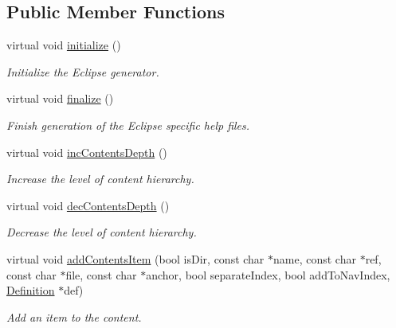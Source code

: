 \subsection*{Public Member Functions}
\begin{DoxyCompactItemize}
\item 
virtual void \mbox{\hyperlink{class_eclipse_help_aefada9c9b474d36ef9b771e2361c8dc1}{initialize}} ()
\begin{DoxyCompactList}\small\item\em Initialize the Eclipse generator. \end{DoxyCompactList}\item 
virtual void \mbox{\hyperlink{class_eclipse_help_a6a8532316d47986f371459e6b09b9d71}{finalize}} ()
\begin{DoxyCompactList}\small\item\em Finish generation of the Eclipse specific help files. \end{DoxyCompactList}\item 
\mbox{\label{class_eclipse_help_a84c091576dab518ca0301144b96cc826}} 
virtual void \mbox{\hyperlink{class_eclipse_help_a84c091576dab518ca0301144b96cc826}{inc\+Contents\+Depth}} ()
\begin{DoxyCompactList}\small\item\em Increase the level of content hierarchy. \end{DoxyCompactList}\item 
virtual void \mbox{\hyperlink{class_eclipse_help_a20d28e23b12cd60a358e7a07fd713262}{dec\+Contents\+Depth}} ()
\begin{DoxyCompactList}\small\item\em Decrease the level of content hierarchy. \end{DoxyCompactList}\item 
virtual void \mbox{\hyperlink{class_eclipse_help_a72d1c982cb362cc6b52660f9f93a95c6}{add\+Contents\+Item}} (bool is\+Dir, const char $\ast$name, const char $\ast$ref, const char $\ast$file, const char $\ast$anchor, bool separate\+Index, bool add\+To\+Nav\+Index, \mbox{\hyperlink{class_definition}{Definition}} $\ast$def)
\begin{DoxyCompactList}\small\item\em Add an item to the content. \end{DoxyCompactList}\item 
\mbox{\label{class_eclipse_help_a6de2526bdffe86881205f920623a1eb8}} 

\end{DoxyCompactItemize}
